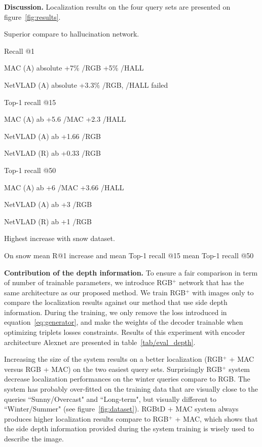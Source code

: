 \noindent\textbf{Discussion.} Localization results on the four query sets are presented on figure~\ref{fig:results}. 

Superior compare to hallucination network.

Recall @1

MAC (A) absolute +7\% /RGB +5\% /HALL

NetVLAD (A) absolute +3.3\% /RGB, /HALL failed

Top-1 recall @15

MAC (A) ab +5.6 /MAC +2.3 /HALL

NetVLAD (A) ab +1.66 /RGB

NetVLAD (R) ab +0.33 /RGB

Top-1 recall @50

MAC (A) ab +6 /MAC +3.66 /HALL

NetVLAD (A) ab +3 /RGB

NetVLAD (R) ab +1 /RGB

Highest increase with snow dataset.

On snow mean R@1 increase and mean Top-1 recall @15 mean Top-1 recall @50 

\noindent\textbf{Contribution of the depth information.} To ensure a fair comparison in term of number of trainable parameters, we introduce RGB$^+$ network that has the same architecture as our proposed method. We train RGB$^+$ with images only to compare the localization results against our method that use side depth information. During the training, we only remove the loss introduced in equation~\ref{eq:generator}, and make the weights of the decoder trainable when optimizing triplets losses constraints. Results of this experiment with encoder architecture Alexnet are presented in table~\ref{tab/eval_depth}.



Increasing the size of the system results on a better localization (RGB$^{+}$ + MAC versus RGB + MAC) on the two easiest query sets. Surprisingly RGB$^{+}$ system decrease localization performances on the winter queries compare to RGB. The system has probably over-fitted on the training data that are visually close to the queries ``Sunny/Overcast" and ``Long-term", but visually different to ``Winter/Summer" (see figure~\ref{fig:dataset}). RGBtD + MAC system always produces higher localization results compare to RGB$^{+}$ + MAC, which shows that the side depth information provided during the system training is wisely used to describe the image. 

